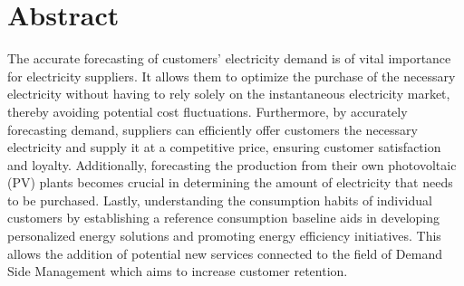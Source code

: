 \chapter*{Abstract} %
\label{abtract}

\vspace{0.4 cm}


The accurate forecasting of customers’ electricity demand is of vital importance for electricity suppliers.
It allows them to optimize the purchase of the necessary electricity without having to rely solely on the instantaneous electricity market, thereby avoiding potential cost fluctuations.
Furthermore, by accurately forecasting demand, suppliers can efficiently offer customers the necessary electricity and supply it at a competitive price, ensuring customer satisfaction and loyalty.
Additionally, forecasting the production from their own photovoltaic (PV) plants becomes crucial in determining the amount of electricity that needs to be purchased.
Lastly, understanding the consumption habits of individual customers by establishing a reference consumption baseline aids in developing personalized energy solutions and promoting energy efficiency initiatives.
This allows the addition of potential new services connected to the field of Demand Side Management which aims to increase customer retention.

